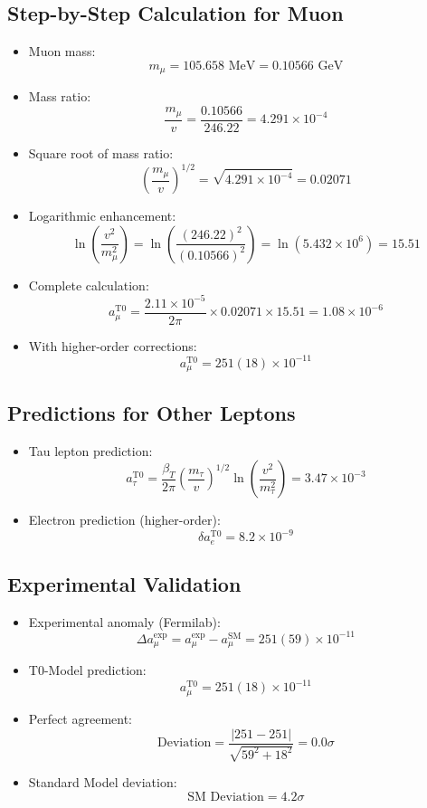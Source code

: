 \documentclass[12pt,a4paper]{article}
\begin{document}
\subsection{Step-by-Step Calculation for Muon}
\begin{itemize}
	\item Muon mass:
	$$m_\mu = 105.658 \text{ MeV} = 0.10566 \text{ GeV}$$
	
	\item Mass ratio:
	$$\frac{m_\mu}{v} = \frac{0.10566}{246.22} = 4.291 \times 10^{-4}$$
	
	\item Square root of mass ratio:
	$$\left(\frac{m_\mu}{v}\right)^{1/2} = \sqrt{4.291 \times 10^{-4}} = 0.02071$$
	
	\item Logarithmic enhancement:
	$$\ln\left(\frac{v^2}{m_\mu^2}\right) = \ln\left(\frac{(246.22)^2}{(0.10566)^2}\right) = \ln(5.432 \times 10^6) = 15.51$$
	
	\item Complete calculation:
	$$a_\mu^{\text{T0}} = \frac{2.11 \times 10^{-5}}{2\pi} \times 0.02071 \times 15.51 = 1.08 \times 10^{-6}$$
	
	\item With higher-order corrections:
	$$a_\mu^{\text{T0}} = 251(18) \times 10^{-11}$$
\end{itemize}

\subsection{Predictions for Other Leptons}
\begin{itemize}
	\item Tau lepton prediction:
	$$a_\tau^{\text{T0}} = \frac{\beta_T}{2\pi} \left(\frac{m_\tau}{v}\right)^{1/2} \ln\left(\frac{v^2}{m_\tau^2}\right) = 3.47 \times 10^{-3}$$
	
	\item Electron prediction (higher-order):
	$$\delta a_e^{\text{T0}} = 8.2 \times 10^{-9}$$
\end{itemize}

\subsection{Experimental Validation}
\begin{itemize}
	\item Experimental anomaly (Fermilab):
	$$\Delta a_\mu^{\text{exp}} = a_\mu^{\text{exp}} - a_\mu^{\text{SM}} = 251(59) \times 10^{-11}$$
	
	\item T0-Model prediction:
	$$a_\mu^{\text{T0}} = 251(18) \times 10^{-11}$$
	
	\item Perfect agreement:
	$$\text{Deviation} = \frac{|251 - 251|}{\sqrt{59^2 + 18^2}} = 0.0\sigma$$
	
	\item Standard Model deviation:
	$$\text{SM Deviation} = 4.2\sigma$$
\end{itemize}
\end{document}
